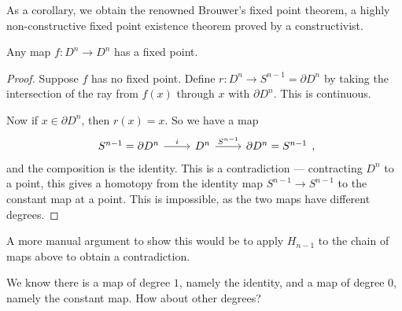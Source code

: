 \documentclass[a4paper]{article}
\begin{document}
As a corollary, we obtain the renowned Brouwer's fixed point theorem, a highly non-constructive fixed point existence theorem proved by a constructivist.
\begin{cor}
  Any map $f: D^n \to D^n$ has a fixed point.
\end{cor}

\begin{proof}
  Suppose $f$ has no fixed point. Define $r: D^n \to S^{n - 1} = \partial D^n$ by taking the intersection of the ray from $f(x)$ through $x$ with $\partial D^n$. This is continuous.
  \begin{center}
  \end{center}
  Now if $x \in \partial D^n$, then $r(x) = x$. So we have a map
  \[
    \begin{tikzcd}
      S^{n - 1} = \partial D^n \ar[r, "i"] & D^n \ar[r, "S^{n - 1}"] & \partial D^n = S^{n - 1}
    \end{tikzcd},
  \]
  and the composition is the identity. This is a contradiction --- contracting $D^n$ to a point, this gives a homotopy from the identity map $S^{n - 1} \to S^{n - 1}$ to the constant map at a point. This is impossible, as the two maps have different degrees.
\end{proof}
A more manual argument to show this would be to apply $H_{n - 1}$ to the chain of maps above to obtain a contradiction.

We know there is a map of degree $1$, namely the identity, and a map of degree $0$, namely the constant map. How about other degrees?
\end{document}

